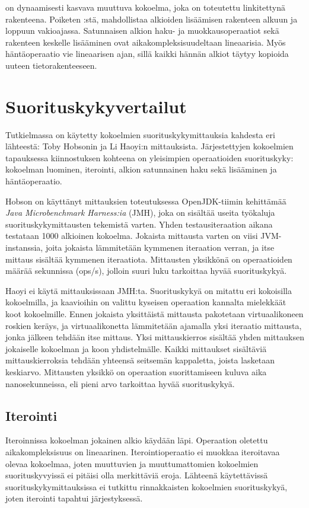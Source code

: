  on dynaamisesti kasvava muuttuva kokoelma, joka on toteutettu linkitettynä rakenteena. Poiketen :stä,  mahdollistaa alkioiden lisäämisen rakenteen alkuun ja loppuun vakioajassa. Satunnaisen alkion haku- ja muokkausoperaatiot sekä rakenteen keskelle lisääminen ovat aikakompleksisuudeltaan lineaarisia. Myös häntäoperaatio vie lineaarisen ajan, sillä kaikki hännän alkiot täytyy kopioida uuteen tietorakenteeseen.
\cite{scalaCollections}


\section{Suorituskykyvertailut}
Tutkielmassa on käytetty kokoelmien suorituskykymittauksia kahdesta eri lähteestä: Toby Hobsonin\cite{hobsonBenchmark} ja Li Haoyi:n\cite{haoyiBenchmark} mittauksista. Järjestettyjen kokoelmien tapauksessa kiinnostuksen kohteena on yleisimpien operaatioiden suorituskyky: kokoelman luominen, iterointi, alkion satunnainen haku sekä lisääminen ja häntäoperaatio. 

Hobson\cite{hobsonBenchmark} on käyttänyt mittauksien toteutuksessa OpenJDK-tiimin kehittämää \textit{Java Microbenchmark Harness:ia} (JMH), joka on sisältää useita työkaluja suorituskykymittausten tekemistä varten. Yhden testausiteraation aikana testataan 1000 alkioinen kokoelma. Jokaista mittausta varten on viisi JVM-instanssia, joita jokaista lämmitetään kymmenen iteraation verran, ja itse mittaus sisältää kymmenen iteraatiota. Mittausten yksikkönä on operaatioiden määrää sekunnissa (ops/s), jolloin suuri luku tarkoittaa hyvää suorituskykyä.
\cite{highPerformanceProgramming}

Haoyi ei käytä mittauksissaan\cite{haoyiBenchmark} JMH:ta. Suorituskykyä on mitattu eri kokoisilla kokoelmilla, ja kaavioihin on valittu kyseisen operaation kannalta mielekkäät koot kokoelmille. Ennen jokaista yksittäistä mittausta pakotetaan virtuaalikoneen roskien keräys, ja virtuaalikonetta lämmitetään ajamalla yksi iteraatio mittausta, jonka jälkeen tehdään itse mittaus. Yksi mittauskierros sisältää yhden mittauksen jokaiselle kokoelman ja koon yhdistelmälle. Kaikki mittaukset sisältäviä mittauskierroksia tehdään yhteensä seitsemän kappaletta, joista lasketaan keskiarvo. Mittausten yksikkö on operaation suorittamiseen kuluva aika nanosekunneissa, eli pieni arvo tarkoittaa hyvää suorituskykyä. 


\subsection{Iterointi}
Iteroinnissa kokoelman jokainen alkio käydään läpi. Operaation oletettu aikakompleksisuus on lineaarinen. Iterointioperaatio ei muokkaa iteroitavaa olevaa kokoelmaa, joten muuttuvien ja muuttumattomien kokoelmien suorituskyvyissä ei pitäisi olla merkittäviä eroja. Lähteenä käytettävissä suorituskykymittauksissa ei tutkittu rinnakkaisten kokoelmien suorituskykyä, joten iterointi tapahtui järjestyksessä.

